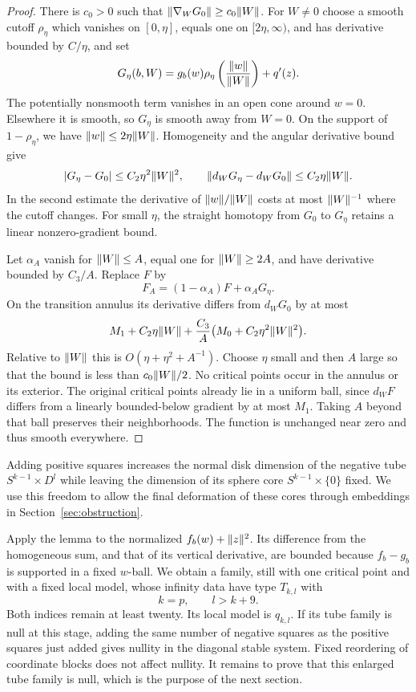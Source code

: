 \begin{proof}
There is $c_0>0$ such that $\lVert\nabla_WG_0\rVert\geq c_0\lVert W\rVert$. For $W\ne0$ choose a smooth cutoff $\rho_\eta$ which vanishes on $[0,\eta]$, equals one on $[2\eta,\infty)$, and has derivative bounded by $C/\eta$, and set
\[
 G_\eta(b,W)=g_b(w)\rho_\eta\left(\frac{\lVert w\rVert}{\lVert W\rVert}\right)+q'(z).
\]
The potentially nonsmooth term vanishes in an open cone around $w=0$. Elsewhere it is smooth, so $G_\eta$ is smooth away from $W=0$. On the support of $1-\rho_\eta$, we have $\lVert w\rVert\leq2\eta\lVert W\rVert$. Homogeneity and the angular derivative bound give
\begin{equation}\label{eq:angular-smoothing-estimates}
 \lvert G_\eta-G_0\rvert\leq C_2\eta^2\lVert W\rVert^2,
 \qquad
 \lVert d_WG_\eta-d_WG_0\rVert\leq C_2\eta\lVert W\rVert.
\end{equation}
In the second estimate the derivative of $\lVert w\rVert/\lVert W\rVert$ costs at most $\lVert W\rVert^{-1}$ where the cutoff changes. For small $\eta$, the straight homotopy from $G_0$ to $G_\eta$ retains a linear nonzero-gradient bound.

Let $\alpha_A$ vanish for $\lVert W\rVert\leq A$, equal one for $\lVert W\rVert\geq2A$, and have derivative bounded by $C_3/A$. Replace $F$ by
\[
 F_A=(1-\alpha_A)F+\alpha_AG_\eta.
\]
On the transition annulus its derivative differs from $d_WG_0$ by at most
\[
 M_1+C_2\eta\lVert W\rVert
 +\frac{C_3}{A}\bigl(M_0+C_2\eta^2\lVert W\rVert^2\bigr).
\]
Relative to $\lVert W\rVert$ this is $O(\eta+\eta^2+A^{-1})$. Choose $\eta$ small and then $A$ large so that the bound is less than $c_0\lVert W\rVert/2$. No critical points occur in the annulus or its exterior. The original critical points already lie in a uniform ball, since $d_WF$ differs from a linearly bounded-below gradient by at most $M_1$. Taking $A$ beyond that ball preserves their neighborhoods. The function is unchanged near zero and thus smooth everywhere.
\end{proof}

Adding positive squares increases the normal disk dimension of the negative
tube $S^{k-1}\times D^l$ while leaving the dimension of its sphere core
$S^{k-1}\times\{0\}$ fixed. We use this freedom to allow the final
deformation of these cores through embeddings in Section~\ref{sec:obstruction}.

Apply the lemma to the normalized $f_b(w)+\lVert z\rVert^2$. Its difference from the homogeneous sum, and that of its vertical derivative, are bounded because $f_b-g_b$ is supported in a fixed $w$-ball. We obtain a family, still with one critical point and with a fixed local model, whose infinity data have type $T_{k,l}$ with
\begin{equation}\label{eq:unbalanced-indices}
 k=p,\qquad l>k+9.
\end{equation}
Both indices remain at least twenty. Its local model is $q_{k,l}$. If its tube family is null at this stage, adding the same number of negative squares as the positive squares just added gives nullity in the diagonal stable system. Fixed reordering of coordinate blocks does not affect nullity. It remains to prove that this enlarged tube family is null, which is the purpose of the next section.
